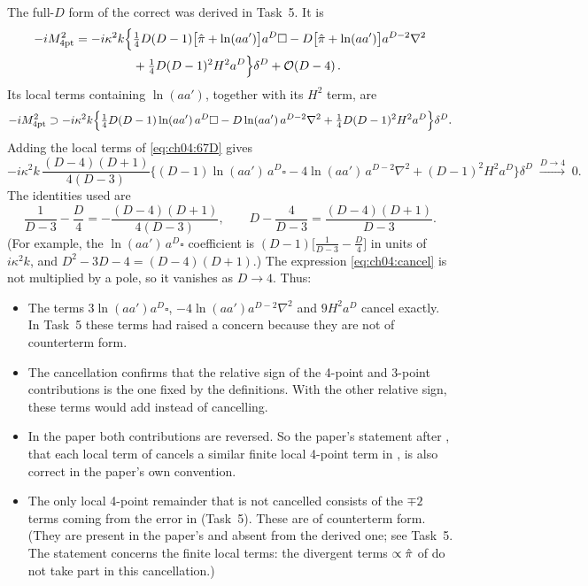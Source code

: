 The full-$D$ form of the correct  was derived in Task~5. It is
\begin{equation}
\begin{aligned}
-iM^2_{\rm 4pt}=-i\kappa^2k\Big\{&\tfrac14D(D-1)\big[\hat\pi+\ln(aa')\big]a^D\square-D\big[\hat\pi+\ln(aa')\big]a^{D-2}\nabla^2\\
&+\tfrac14D(D-1)^2H^2a^D\Big\}\delta^D+\mathcal{O}\!\left(D-4\right).
\end{aligned}
\end{equation}
Its local terms containing $\ln(aa')$, together with its $H^2$ term, are
\begin{equation}
-iM^2_{\rm 4pt}\supset-i\kappa^2k\Big\{\tfrac14D(D-1)\ln(aa')\,a^D\square-D\ln(aa')\,a^{D-2}\nabla^2+\tfrac14D(D-1)^2H^2a^D\Big\}\delta^D .
\end{equation}
Adding the local terms of \eqref{eq:ch04:67D} gives
\begin{equation}
-i\kappa^2k\,\frac{(D-4)(D+1)}{4(D-3)}\Big\{(D-1)\ln(aa')\,a^D\square-4\ln(aa')\,a^{D-2}\nabla^2+(D-1)^2H^2a^D\Big\}\delta^D\;\xrightarrow{D\to4}\;0 .
\label{eq:ch04:cancel}
\end{equation}
The identities used are
\begin{equation}
\frac{1}{D-3}-\frac D4=-\frac{(D-4)(D+1)}{4(D-3)},\qquad D-\frac{4}{D-3}=\frac{(D-4)(D+1)}{D-3}.
\end{equation}
(For example, the $\ln(aa')\,a^D\square$ coefficient is $(D-1)\big[\frac{1}{D-3}-\frac D4\big]$ in units of $i\kappa^2k$, and $D^2-3D-4=(D-4)(D+1)$.)
The expression \eqref{eq:ch04:cancel} is not multiplied by a pole, so it vanishes as $D\to4$. Thus:
\begin{itemize}[leftmargin=1.2em,itemsep=2pt]
\item The terms $3\ln(aa')a^D\square$, $-4\ln(aa')a^{D-2}\nabla^2$ and $9H^2a^D$ cancel exactly.
In Task~5 these terms had raised a concern because they are not of counterterm form.
\item The cancellation confirms that the relative sign of the 4-point and 3-point contributions is the one fixed by the definitions.
With the other relative sign, these terms would add instead of cancelling.
\item In the paper both contributions are reversed.
So the paper's statement after , that each local term of  cancels a similar finite local 4-point term in , is also correct in the paper's own convention.
\item The only local 4-point remainder that is not cancelled consists of the $\mp2$ terms coming from the error in  (Task~5).
These are of counterterm form.
(They are present in the paper's  and absent from the derived one; see Task~5. The statement concerns the finite local terms: the divergent terms $\propto\hat\pi$ of  do not take part in this cancellation.)
\end{itemize}

